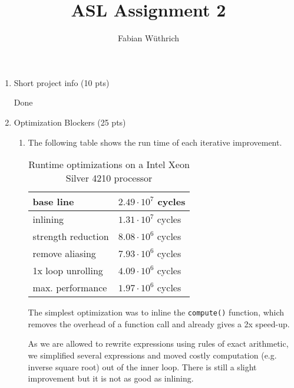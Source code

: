 \documentclass[a4paper]{article}
\title{ASL Assignment 2}
\author{Fabian Wüthrich}
\begin{document}
\maketitle

\begin{enumerate}
    \item Short project info (10 pts) \par
    Done
    
    \item Optimization Blockers (25 pts)
    
    \begin{enumerate}
        \item The following table shows the run time of each iterative improvement. 
            
        \begin{table}[h!]
        \begin{center}
        \begin{tabularx}{0.5\textwidth} { 
          | >{\raggedleft\arraybackslash}X 
          | >{\centering\arraybackslash}X | }
            \hline
            base line & $2.49 \cdot 10^7$ cycles \\ \hline
            inlining & $1.31 \cdot 10^7$ cycles \\ \hline
            strength reduction & $8.08 \cdot 10^6$ cycles \\ \hline
            remove aliasing & $7.93 \cdot 10^6$ cycles \\ \hline
            1x loop unrolling & $4.09 \cdot 10^6$ cycles \\ \hline
            max. performance & $1.97 \cdot 10^6$ cycles \\ 
            \hline
        \end{tabularx}
        \caption{Runtime optimizations on a Intel Xeon Silver 4210 processor}
        \end{center}
        \end{table}
        
        The simplest optimization was to inline the \verb|compute()| function, which removes the overhead of a function call and already gives a 2x speed-up.
        
        As we are allowed to rewrite expressions using rules of exact arithmetic, we simplified several expressions and moved costly computation (e.g. inverse square root) out of the inner loop. There is still a slight improvement but it is not as good as inlining.
        

\end{enumerate}
\end{enumerate}
\end{document}
